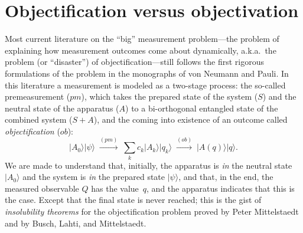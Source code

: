\documentclass[smallextended]{svjour3}
\newcommand{\ket}[1]{|#1\rangle}
\newcommand{\be}{\begin{equation}}
\newcommand{\ee}{\end{equation}}
\begin{document}
\section{Objectification versus objectivation}\label{sec.ovo}
Most current literature on the ``big'' measurement problem\cite{Pitowsky2006}---the problem of explaining how measurement outcomes come about dynamically, a.k.a.\ the problem (or ``disaster''\cite{vF1990}) of objectification---still follows the first rigorous formulations of the problem in the monographs of von Neumann\cite{vN} and Pauli.\cite{PauliGP} In this literature a measurement is modeled as a two-stage process: the so-called {premeasurement} ($pm$), which takes the prepared state of the system ($S$) and the neutral state of the apparatus ($A$) to a bi-orthogonal entangled state of the combined system ($S{+}A$), and the coming into existence of an outcome called \emph{objectification} ($ob$):
\be
\ket{A_0}\ket\psi
                 \;\stackrel{(pm)}{\longrightarrow}\;
\sum_{k}c_k\ket{A_k}\ket{q_k}
                  \;\stackrel{(ob)}{\longrightarrow}\;
\ket{A(q)}\ket{q}.
\label{eq_pmob}
\ee
We are made to understand that, initially, the apparatus is \emph{in} the neutral state $\ket{A_0}$ and the system is \emph{in} the prepared state $\ket\psi$, and that, in the end, the measured observable $Q$ has the value~$q$, and the apparatus indicates that this is the case. Except that the final state is never reached; this is the gist of \emph{insolubility theorems} for the objectification problem proved by Peter Mittelstaedt\cite{Mittelstaedt98} and by Busch, Lahti, and Mittelstaedt.\cite{BLM96} 
\end{document}
